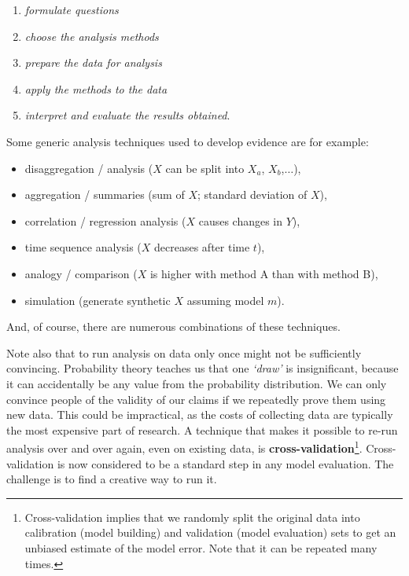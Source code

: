 \documentclass[graybox,envcountchap,sectrefs,UStrade]{svmono}
\begin{document}
\begin{enumerate}
  \item \emph{formulate questions}
  \item \emph{choose the analysis methods}
  \item \emph{prepare the data for analysis}
  \item \emph{apply the methods to the data}
  \item \emph{interpret and evaluate the results obtained}.
\end{enumerate}

\noindent Some generic analysis techniques used to develop evidence are for example:

\begin{itemize}
  \item disaggregation / analysis ($X$ can be split into $X_a$, $X_b$,$\ldots$),
  \item aggregation / summaries (sum of $X$; standard deviation of $X$),
  \item correlation / regression analysis ($X$ causes changes in $Y$),
  \item time sequence analysis ($X$ decreases after time $t$),
  \item analogy / comparison ($X$ is higher with method A than with method B),
  \item simulation (generate synthetic $X$ assuming model $m$).
\end{itemize}

\noindent And, of course, there are numerous combinations of these techniques.\par

Note also that to run analysis on data only once might not be sufficiently convincing. Probability theory teaches us that one \emph{`draw'} is insignificant, because it can accidentally be any value from the probability distribution. We can only convince people of the validity of our claims if we repeatedly prove them using new data. This could be impractical, as the costs of collecting data are typically the most expensive part of research. A technique that makes it possible to re-run analysis over and over again, even on existing data, is \textbf{cross-validation}\footnote{Cross-validation implies that we randomly split the original data into calibration (model building) and validation (model evaluation) sets to get an unbiased estimate of the model error. Note that it can be repeated many times.}. Cross-validation is now considered to be a standard step in any model evaluation. The challenge is to find a creative way to run it.\par
\end{document}

